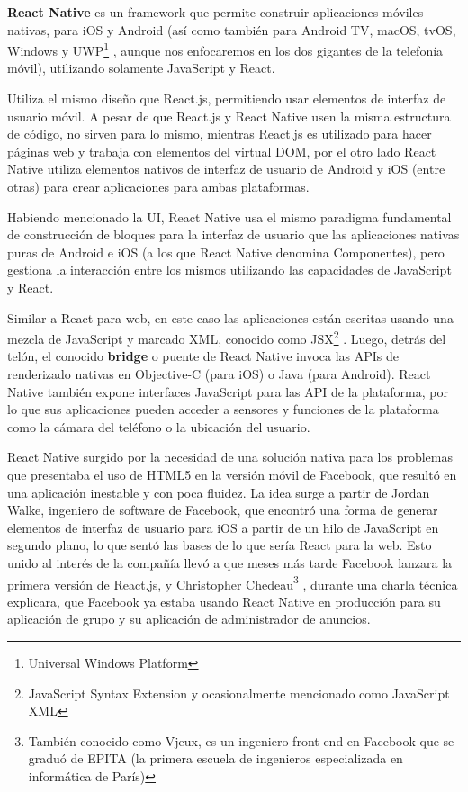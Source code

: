 \textbf{React Native} es un framework que permite construir aplicaciones móviles nativas, para iOS y Android (así como también para Android TV, macOS, tvOS, Windows y UWP\footnote{Universal Windows Platform}  , aunque nos enfocaremos en los dos gigantes de la telefonía móvil), utilizando solamente JavaScript y React.

Utiliza el mismo diseño que React.js, permitiendo usar elementos de interfaz de usuario móvil. A pesar de que React.js y React Native usen la misma estructura de código, no sirven para lo mismo, mientras React.js es utilizado para hacer páginas web y trabaja con elementos del virtual DOM, por el otro lado React Native utiliza elementos nativos de interfaz de usuario de Android y iOS (entre otras) para crear aplicaciones para ambas plataformas.

Habiendo mencionado la UI, React Native usa el mismo paradigma fundamental de construcción de bloques para la interfaz de usuario que las aplicaciones nativas puras de Android e iOS (a los que React Native denomina Componentes), pero gestiona la interacción entre los mismos utilizando las capacidades de JavaScript y React.

Similar a React para web, en este caso las aplicaciones están escritas usando una mezcla de JavaScript y marcado XML, conocido como JSX\footnote{JavaScript Syntax Extension y ocasionalmente mencionado como JavaScript XML} . Luego, detrás del telón, el conocido \textbf{bridge} o puente de React Native invoca las APIs de renderizado nativas en Objective-C (para iOS) o Java (para Android). React Native también expone interfaces JavaScript para las API de la plataforma, por lo que sus aplicaciones pueden acceder a sensores y funciones de la plataforma como la cámara del teléfono o la ubicación del usuario.

React Native surgido por la necesidad de una solución nativa para los problemas que presentaba el uso de HTML5 en la versión móvil de Facebook, que resultó en una aplicación inestable y con poca fluidez. La idea surge a partir de Jordan Walke, ingeniero de software de Facebook, que encontró una forma de generar elementos de interfaz de usuario para iOS a partir de un hilo de JavaScript en segundo plano, lo que sentó las bases de lo que sería React para la web. Esto unido al interés de la compañía llevó a que meses más tarde Facebook lanzara la primera versión de React.js, y Christopher Chedeau\footnote{También conocido como Vjeux, es un ingeniero front-end en Facebook que se graduó de EPITA (la primera escuela de ingenieros especializada en informática de París)} , durante una charla técnica explicara, que Facebook ya estaba usando React Native en producción para su aplicación de grupo y su aplicación de administrador de anuncios.

